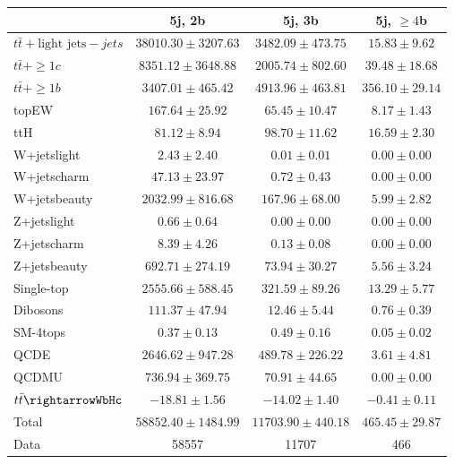 \begin{table}
\begin{center}
  \begin{tabular}{ | l |  c |  c |  c | }
    \hline \hline 
     & 5j, 2b  & 5j, 3b  &  5j, $\geq4$b  \\ 
    \hline 
     $t\bar{t}+\text{light jets}-jets$  &   $ 38010.30 \pm 3207.63 $ &   $ 3482.09 \pm 473.75 $ &   $ 15.83 \pm 9.62 $ \\ 
     $t\bar{t}+\geq1c$  &   $ 8351.12 \pm 3648.88 $ &   $ 2005.74 \pm 802.60 $ &   $ 39.48 \pm 18.68 $ \\ 
     $t\bar{t}+\geq1b$  &   $ 3407.01 \pm 465.42 $ &   $ 4913.96 \pm 463.81 $ &   $ 356.10 \pm 29.14 $ \\ 
    topEW  &   $ 167.64 \pm 25.92 $ &   $ 65.45 \pm 10.47 $ &   $ 8.17 \pm 1.43 $ \\ 
    ttH  &   $ 81.12 \pm 8.94 $ &   $ 98.70 \pm 11.62 $ &   $ 16.59 \pm 2.30 $ \\ 
    W+jetslight  &   $ 2.43 \pm 2.40 $ &   $ 0.01 \pm 0.01 $ &   $ 0.00 \pm 0.00 $ \\ 
    W+jetscharm  &   $ 47.13 \pm 23.97 $ &   $ 0.72 \pm 0.43 $ &   $ 0.00 \pm 0.00 $ \\ 
    W+jetsbeauty  &   $ 2032.99 \pm 816.68 $ &   $ 167.96 \pm 68.00 $ &   $ 5.99 \pm 2.82 $ \\ 
    Z+jetslight  &   $ 0.66 \pm 0.64 $ &   $ 0.00 \pm 0.00 $ &   $ 0.00 \pm 0.00 $ \\ 
    Z+jetscharm  &   $ 8.39 \pm 4.26 $ &   $ 0.13 \pm 0.08 $ &   $ 0.00 \pm 0.00 $ \\ 
    Z+jetsbeauty  &   $ 692.71 \pm 274.19 $ &   $ 73.94 \pm 30.27 $ &   $ 5.56 \pm 3.24 $ \\ 
    Single-top  &   $ 2555.66 \pm 588.45 $ &   $ 321.59 \pm 89.26 $ &   $ 13.29 \pm 5.77 $ \\ 
    Dibosons  &   $ 111.37 \pm 47.94 $ &   $ 12.46 \pm 5.44 $ &   $ 0.76 \pm 0.39 $ \\ 
    SM-4tops  &   $ 0.37 \pm 0.13 $ &   $ 0.49 \pm 0.16 $ &   $ 0.05 \pm 0.02 $ \\ 
    QCDE  &   $ 2646.62 \pm 947.28 $ &   $ 489.78 \pm 226.22 $ &   $ 3.61 \pm 4.81 $ \\ 
    QCDMU  &   $ 736.94 \pm 369.75 $ &   $ 70.91 \pm 44.65 $ &   $ 0.00 \pm 0.00 $ \\ 
     $t\bar{t}\rightarrowWbHc$  &   $ -18.81 \pm 1.56 $ &   $ -14.02 \pm 1.40 $ &   $ -0.41 \pm 0.11 $ \\ 
    Total  &   $ 58852.40 \pm 1484.99 $ &   $ 11703.90 \pm 440.18 $ &   $ 465.45 \pm 29.87 $ \\ 
    \hline 
    Data  & 58557  & 11707  & 466  \\ 
    \hline \hline 
  \end{tabular} 



\end{center}
\end{table}
